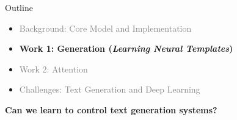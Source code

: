 
\begin{frame}{ Outline}
  \begin{itemize}
  \item \textcolor{gray}{Background: Core Model and Implementation}
    \air
  \item \textbf{Work 1: Generation (\textit{Learning Neural Templates})}
    \air

  \item \textcolor{gray}{Work 2: Attention}
    \air


  \item \textcolor{gray}{Challenges: Text Generation and Deep Learning}
  \end{itemize}

  \begin{center}
    \textbf{Can we learn to control text generation systems?}
  \end{center}

\end{frame}







